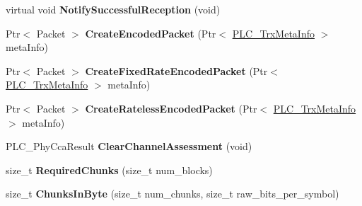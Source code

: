 \begin{DoxyCompactItemize}
\item 
\hypertarget{classns3_1_1PLC__InformationRatePhy_ab734c72ab9d3d3e60a01438a1114c128}{virtual void {\bfseries \-Notify\-Successful\-Reception} (void)}\label{classns3_1_1PLC__InformationRatePhy_ab734c72ab9d3d3e60a01438a1114c128}

\item 
\hypertarget{classns3_1_1PLC__InformationRatePhy_ad32af16b7a80bbc11f492092d9f7dd58}{\-Ptr$<$ \-Packet $>$ {\bfseries \-Create\-Encoded\-Packet} (\-Ptr$<$ \hyperlink{classns3_1_1PLC__TrxMetaInfo}{\-P\-L\-C\-\_\-\-Trx\-Meta\-Info} $>$ meta\-Info)}\label{classns3_1_1PLC__InformationRatePhy_ad32af16b7a80bbc11f492092d9f7dd58}

\item 
\hypertarget{classns3_1_1PLC__InformationRatePhy_a059d1e2ed5a90059c6cf5ed052ae66d9}{\-Ptr$<$ \-Packet $>$ {\bfseries \-Create\-Fixed\-Rate\-Encoded\-Packet} (\-Ptr$<$ \hyperlink{classns3_1_1PLC__TrxMetaInfo}{\-P\-L\-C\-\_\-\-Trx\-Meta\-Info} $>$ meta\-Info)}\label{classns3_1_1PLC__InformationRatePhy_a059d1e2ed5a90059c6cf5ed052ae66d9}

\item 
\hypertarget{classns3_1_1PLC__InformationRatePhy_a31133237a6d4ede035ff4969a4b4ffdd}{\-Ptr$<$ \-Packet $>$ {\bfseries \-Create\-Rateless\-Encoded\-Packet} (\-Ptr$<$ \hyperlink{classns3_1_1PLC__TrxMetaInfo}{\-P\-L\-C\-\_\-\-Trx\-Meta\-Info} $>$ meta\-Info)}\label{classns3_1_1PLC__InformationRatePhy_a31133237a6d4ede035ff4969a4b4ffdd}

\item 
\hypertarget{classns3_1_1PLC__InformationRatePhy_a9bdb8a8081ba19483616f36eca2b8937}{\-P\-L\-C\-\_\-\-Phy\-Cca\-Result {\bfseries \-Clear\-Channel\-Assessment} (void)}\label{classns3_1_1PLC__InformationRatePhy_a9bdb8a8081ba19483616f36eca2b8937}

\item 
\hypertarget{classns3_1_1PLC__InformationRatePhy_ae1a8ca42e425e7970fb01530fa04c9ee}{size\-\_\-t {\bfseries \-Required\-Chunks} (size\-\_\-t num\-\_\-blocks)}\label{classns3_1_1PLC__InformationRatePhy_ae1a8ca42e425e7970fb01530fa04c9ee}

\item 
\hypertarget{classns3_1_1PLC__InformationRatePhy_a6a3a1378c73dbca25892bbb00f715973}{size\-\_\-t {\bfseries \-Chunks\-In\-Byte} (size\-\_\-t num\-\_\-chunks, size\-\_\-t raw\-\_\-bits\-\_\-per\-\_\-symbol)}\label{classns3_1_1PLC__InformationRatePhy_a6a3a1378c73dbca25892bbb00f715973}

\end{DoxyCompactItemize}
